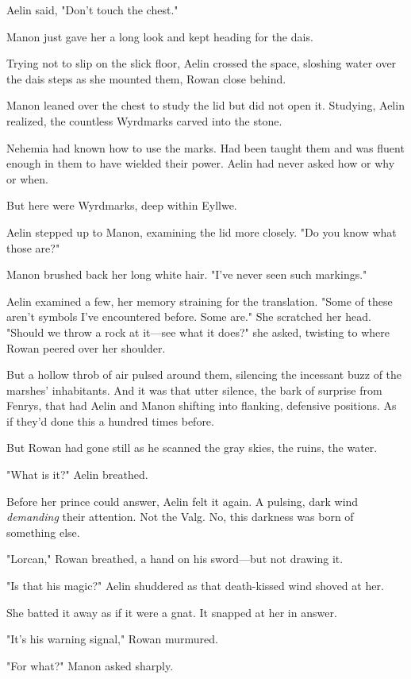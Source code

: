 Aelin said, "Don't touch the chest."

Manon just gave her a long look and kept heading for the dais.

Trying not to slip on the slick floor, Aelin crossed the space, sloshing water over the dais steps as she mounted them, Rowan close behind.

Manon leaned over the chest to study the lid but did not open it. Studying, Aelin realized, the countless Wyrdmarks carved into the stone.

Nehemia had known how to use the marks. Had been taught them and was fluent enough in them to have wielded their power. Aelin had never asked how or why or when.

But here were Wyrdmarks, deep within Eyllwe.

Aelin stepped up to Manon, examining the lid more closely. "Do you know what those are?"

Manon brushed back her long white hair. "I've never seen such markings."

Aelin examined a few, her memory straining for the translation. "Some of these aren't symbols I've encountered before. Some are." She scratched her head. "Should we throw a rock at it---see what it does?" she asked, twisting to where Rowan peered over her shoulder.

But a hollow throb of air pulsed around them, silencing the incessant buzz of the marshes' inhabitants. And it was that utter silence, the bark of surprise from Fenrys, that had Aelin and Manon shifting into flanking, defensive positions. As if they'd done this a hundred times before.

But Rowan had gone still as he scanned the gray skies, the ruins, the water.

"What is it?" Aelin breathed.

Before her prince could answer, Aelin felt it again. A pulsing, dark wind \emph{demanding} their attention. Not the Valg. No, this darkness was born of something else.

"Lorcan," Rowan breathed, a hand on his sword---but not drawing it.

"Is that his magic?" Aelin shuddered as that death-kissed wind shoved at her.

She batted it away as if it were a gnat. It snapped at her in answer.

"It's his warning signal," Rowan murmured.

"For what?" Manon asked sharply.

